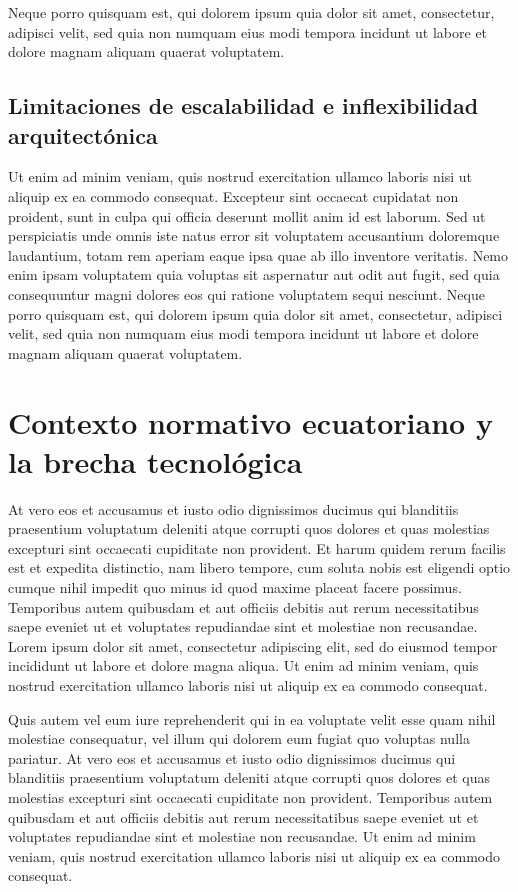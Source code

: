Neque porro quisquam est, qui dolorem ipsum quia dolor sit amet, consectetur, adipisci velit, sed quia non numquam eius modi tempora incidunt ut labore et dolore magnam aliquam quaerat voluptatem.

\subsection{Limitaciones de escalabilidad e inflexibilidad arquitectónica}

Ut enim ad minim veniam, quis nostrud exercitation ullamco laboris nisi ut aliquip ex ea commodo consequat. Excepteur sint occaecat cupidatat non proident, sunt in culpa qui officia deserunt mollit anim id est laborum. Sed ut perspiciatis unde omnis iste natus error sit voluptatem accusantium doloremque laudantium, totam rem aperiam eaque ipsa quae ab illo inventore veritatis. Nemo enim ipsam voluptatem quia voluptas sit aspernatur aut odit aut fugit, sed quia consequuntur magni dolores eos qui ratione voluptatem sequi nesciunt. Neque porro quisquam est, qui dolorem ipsum quia dolor sit amet, consectetur, adipisci velit, sed quia non numquam eius modi tempora incidunt ut labore et dolore magnam aliquam quaerat voluptatem.


\section{Contexto normativo ecuatoriano y la brecha tecnológica}

At vero eos et accusamus et iusto odio dignissimos ducimus qui blanditiis praesentium voluptatum deleniti atque corrupti quos dolores et quas molestias excepturi sint occaecati cupiditate non provident. Et harum quidem rerum facilis est et expedita distinctio, nam libero tempore, cum soluta nobis est eligendi optio cumque nihil impedit quo minus id quod maxime placeat facere possimus. Temporibus autem quibusdam et aut officiis debitis aut rerum necessitatibus saepe eveniet ut et voluptates repudiandae sint et molestiae non recusandae. Lorem ipsum dolor sit amet, consectetur adipiscing elit, sed do eiusmod tempor incididunt ut labore et dolore magna aliqua. Ut enim ad minim veniam, quis nostrud exercitation ullamco laboris nisi ut aliquip ex ea commodo consequat.

Quis autem vel eum iure reprehenderit qui in ea voluptate velit esse quam nihil molestiae consequatur, vel illum qui dolorem eum fugiat quo voluptas nulla pariatur. At vero eos et accusamus et iusto odio dignissimos ducimus qui blanditiis praesentium voluptatum deleniti atque corrupti quos dolores et quas molestias excepturi sint occaecati cupiditate non provident. Temporibus autem quibusdam et aut officiis debitis aut rerum necessitatibus saepe eveniet ut et voluptates repudiandae sint et molestiae non recusandae. Ut enim ad minim veniam, quis nostrud exercitation ullamco laboris nisi ut aliquip ex ea commodo consequat.

